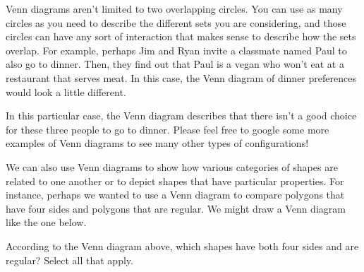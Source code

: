 \documentclass{ximera}
\begin{document}
Venn diagrams aren't limited to two overlapping circles. You can use as many circles as you need to describe the different sets you are considering, and those circles can have any sort of interaction that makes sense to describe how the sets overlap. For example, perhaps Jim and Ryan invite a classmate named Paul to also go to dinner. Then, they find out that Paul is a vegan who won't eat at a restaurant that serves meat. In this case, the Venn diagram of dinner preferences would look a little different.
\begin{image}
\end{image}
In this particular case, the Venn diagram describes that there isn't a good choice for these three people to go to dinner. Please feel free to google some more examples of Venn diagrams to see many other types of configurations!

We can also use Venn diagrams to show how various categories of shapes are related to one another or to depict shapes that have particular properties. For instance, perhaps we wanted to use a Venn diagram to compare polygons that have four sides and polygons that are regular. We might draw a Venn diagram like the one below.

\begin{image}
\end{image}

\begin{question}
According to the Venn diagram above, which shapes have both four sides and are regular? Select all that apply.
\begin{selectAll}
\end{selectAll}
\end{question}
\end{document}
